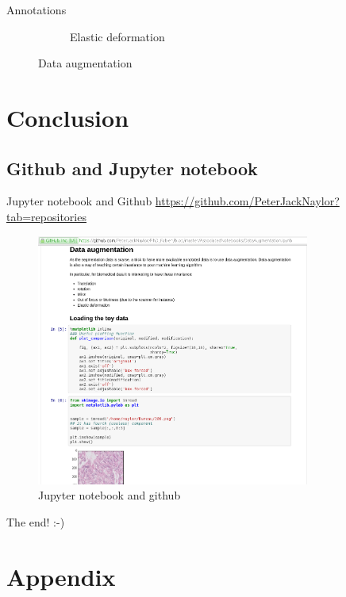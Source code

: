 \documentclass{beamer}
\begin{document}
\begin{frame}{Annotations}
\begin{figure}
\begin{multicols}{6}
\begin{subfigure}{0.2\textwidth}
     \caption{Elastic deformation}
     \label{fig:elastic}
	\end{subfigure}%
\end{multicols}
\caption{Data augmentation}
\end{figure}

\end{frame}

\section{Conclusion}

\subsection{Github and Jupyter notebook}

\begin{frame}{Jupyter notebook and Github}
\url{https://github.com/PeterJackNaylor?tab=repositories}
\begin{figure}
\includegraphics[width=0.8\textwidth]{GitBook.png}
\caption{Jupyter notebook and github}
\end{figure}
\end{frame}


\begin{frame}
The end! :-)
\end{frame}
\section*{Appendix}
\end{document}
